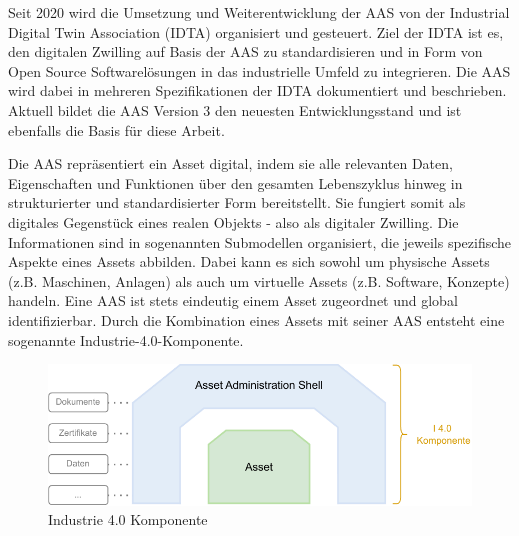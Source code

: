 Seit 2020 wird die Umsetzung und Weiterentwicklung der AAS von der Industrial Digital Twin Association (IDTA) \cite{IDTA} organisiert und gesteuert.
Ziel der IDTA ist es, den digitalen Zwilling auf Basis der AAS zu standardisieren und in Form von Open Source Softwarelösungen in das industrielle Umfeld zu integrieren.
Die AAS wird dabei in mehreren Spezifikationen der IDTA dokumentiert und beschrieben.
Aktuell bildet die AAS Version 3 den neuesten Entwicklungsstand und ist ebenfalls die Basis für diese Arbeit.

Die AAS repräsentiert ein Asset digital, indem sie alle relevanten Daten, Eigenschaften und Funktionen über den gesamten Lebenszyklus hinweg in strukturierter und standardisierter Form bereitstellt. 
Sie fungiert somit als digitales Gegenstück eines realen Objekts - also als digitaler Zwilling.
Die Informationen sind in sogenannten Submodellen organisiert, die jeweils spezifische Aspekte eines Assets abbilden.
Dabei kann es sich sowohl um physische Assets (z.B. Maschinen, Anlagen) als auch um virtuelle Assets (z.B. Software, Konzepte) handeln. 
Eine AAS ist stets eindeutig einem Asset zugeordnet und global identifizierbar. 
Durch die Kombination eines Assets mit seiner AAS entsteht eine sogenannte Industrie-4.0-Komponente.

\vspace{2em}
\begin{figure}[htbp]
    \centering
    \includegraphics[width=1\textwidth]{Bilder/i4_komponente_neu.pdf}
    \caption{Industrie 4.0 Komponente}
    \label{fig:klassifizierungDT}
\end{figure}

